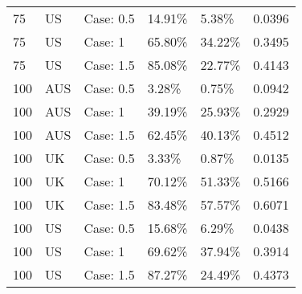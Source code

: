 \begin{table}[ht]
\begin{tabular}{llllll}
  75 & US & Case: 0.5 & 14.91\% & 5.38\% & 0.0396 \\ 
  75 & US & Case: 1 & 65.80\% & 34.22\% & 0.3495 \\ 
  75 & US & Case: 1.5 & 85.08\% & 22.77\% & 0.4143 \\ 
  100 & AUS & Case: 0.5 & 3.28\% & 0.75\% & 0.0942 \\ 
  100 & AUS & Case: 1 & 39.19\% & 25.93\% & 0.2929 \\ 
  100 & AUS & Case: 1.5 & 62.45\% & 40.13\% & 0.4512 \\ 
  100 & UK & Case: 0.5 & 3.33\% & 0.87\% & 0.0135 \\ 
  100 & UK & Case: 1 & 70.12\% & 51.33\% & 0.5166 \\ 
  100 & UK & Case: 1.5 & 83.48\% & 57.57\% & 0.6071 \\ 
  100 & US & Case: 0.5 & 15.68\% & 6.29\% & 0.0438 \\ 
  100 & US & Case: 1 & 69.62\% & 37.94\% & 0.3914 \\ 
  100 & US & Case: 1.5 & 87.27\% & 24.49\% & 0.4373 \\ 
   \hline
\end{tabular}
\end{table}
